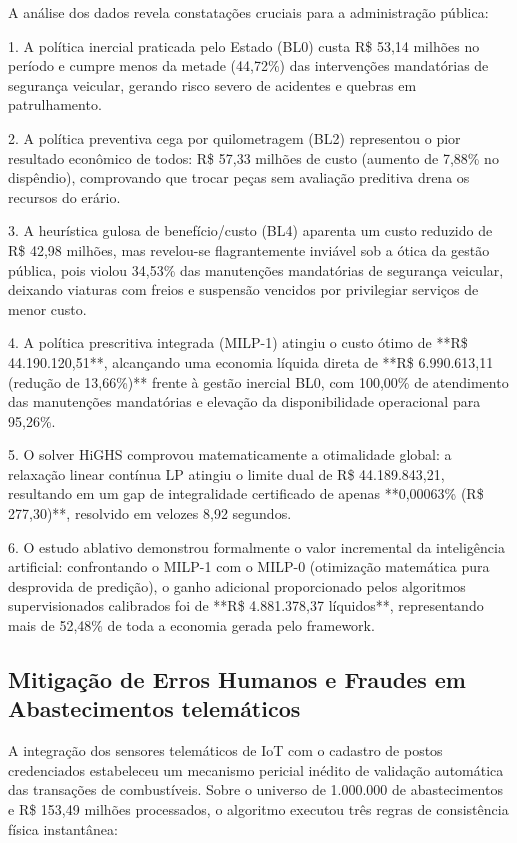 \documentclass[12pt,a4paper]{article}
\begin{document}
A análise dos dados revela constatações cruciais para a administração pública:

1. A política inercial praticada pelo Estado (BL0) custa R\$ 53,14 milhões no período e cumpre menos da metade (44,72\%) das intervenções mandatórias de segurança veicular, gerando risco severo de acidentes e quebras em patrulhamento.

2. A política preventiva cega por quilometragem (BL2) representou o pior resultado econômico de todos: R\$ 57,33 milhões de custo (aumento de 7,88\% no dispêndio), comprovando que trocar peças sem avaliação preditiva drena os recursos do erário.

3. A heurística gulosa de benefício/custo (BL4) aparenta um custo reduzido de R\$ 42,98 milhões, mas revelou-se flagrantemente inviável sob a ótica da gestão pública, pois violou 34,53\% das manutenções mandatórias de segurança veicular, deixando viaturas com freios e suspensão vencidos por privilegiar serviços de menor custo.

4. A política prescritiva integrada (MILP-1) atingiu o custo ótimo de **R\$ 44.190.120,51**, alcançando uma economia líquida direta de **R\$ 6.990.613,11 (redução de 13,66\%)** frente à gestão inercial BL0, com 100,00\% de atendimento das manutenções mandatórias e elevação da disponibilidade operacional para 95,26\%.

5. O solver HiGHS comprovou matematicamente a otimalidade global: a relaxação linear contínua LP atingiu o limite dual de R\$ 44.189.843,21, resultando em um gap de integralidade certificado de apenas **0,00063\% (R\$ 277,30)**, resolvido em velozes 8,92 segundos.

6. O estudo ablativo demonstrou formalmente o valor incremental da inteligência artificial: confrontando o MILP-1 com o MILP-0 (otimização matemática pura desprovida de predição), o ganho adicional proporcionado pelos algoritmos supervisionados calibrados foi de **R\$ 4.881.378,37 líquidos**, representando mais de 52,48\% de toda a economia gerada pelo framework.


\subsection{Mitigação de Erros Humanos e Fraudes em Abastecimentos telemáticos}

A integração dos sensores telemáticos de IoT com o cadastro de postos credenciados estabeleceu um mecanismo pericial inédito de validação automática das transações de combustíveis. Sobre o universo de 1.000.000 de abastecimentos e R\$ 153,49 milhões processados, o algoritmo executou três regras de consistência física instantânea:
\end{document}
